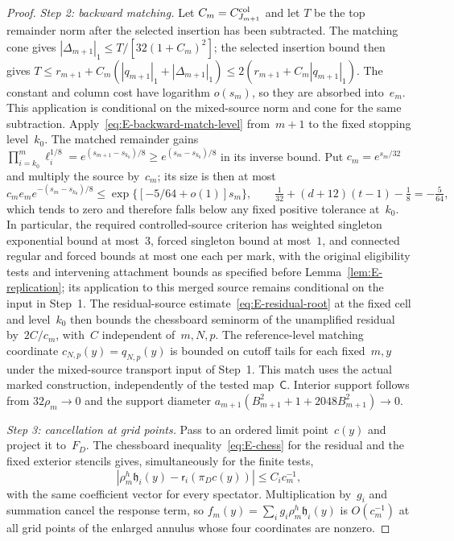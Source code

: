 \begin{proof}
\emph{Step 2: backward matching.} Let $C_m=C^{\rm col}_{J_{m+1}}$ and let $T$ be the top remainder norm after the selected insertion has been subtracted. The matching cone gives $|\Delta_{m+1}|_1\le T/[32(1+C_m)^2]$; the selected insertion bound then gives $T\le r_{m+1}+C_m(|q_{m+1}|_1+|\Delta_{m+1}|_1)\le2(r_{m+1}+C_m|q_{m+1}|_1)$. The constant and column cost have logarithm $o(s_m)$, so they are absorbed into~$e_m$. This application is conditional on the mixed-source norm and cone for the same subtraction. Apply~\eqref{eq:E-backward-match-level} from~$m+1$ to the fixed stopping level~$k_0$. The matched remainder gains $\prod_{i=k_0}^{m}\ell_i^{1/8}=e^{(s_{m+1}-s_{k_0})/8}\ge e^{(s_m-s_{k_0})/8}$ in its inverse bound. Put $c_m=e^{s_m/32}$ and multiply the source by~$c_m$; its size is then at most
\begin{equation*}
c_me_me^{-(s_m-s_{k_0})/8}
\le\exp\{[-5/64+o(1)]s_m\},\qquad
\tfrac1{32}+(d+12)(t-1)-\tfrac18=-\tfrac5{64},
\end{equation*}
which tends to zero and therefore falls below any fixed positive tolerance at~$k_0$. In particular, the required controlled-source criterion has weighted singleton exponential bound at most~$3$, forced singleton bound at most~$1$, and connected regular and forced bounds at most one each per mark, with the original eligibility tests and intervening attachment bounds as specified before Lemma~\ref{lem:E-replication}; its application to this merged source remains conditional on the input in Step~1. The residual-source estimate~\eqref{eq:E-residual-root} at the fixed cell and level~$k_0$ then bounds the chessboard seminorm of the unamplified residual by~$2C/c_m$, with~$C$ independent of~$m,N,p$. The reference-level matching coordinate $c_{N,p}(y)=q_{N,p}(y)$ is bounded on cutoff tails for each fixed~$m,y$ under the mixed-source transport input of Step~1. This match uses the actual marked construction, independently of the tested map~$\mathsf C$. Interior support follows from $32\rho_m\to0$ and the support diameter $a_{m+1}(B_{m+1}^2+1+2048B_{m+1}^2)\to0$.

\emph{Step 3: cancellation at grid points.} Pass to an ordered limit point~$c(y)$ and project it to~$F_D$. The chessboard inequality~\eqref{eq:E-chess} for the residual and the fixed exterior stencils gives, simultaneously for the finite tests,
\begin{equation*}
|\rho_m^h\mathfrak h_i(y)-\mathsf r_i(\pi_Dc(y))|\le C_i c_m^{-1},
\end{equation*}
with the same coefficient vector for every spectator. Multiplication by~$g_i$ and summation cancel the response term, so $f_m(y)=\sum_i g_i\rho_m^h\mathfrak h_i(y)$ is $O(c_m^{-1})$ at all grid points of the enlarged annulus whose four coordinates are nonzero.


\end{proof}
